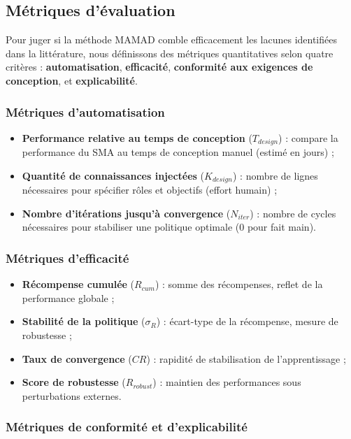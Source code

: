 \subsection{Métriques d'évaluation}

Pour juger si la méthode \ac{MAMAD} comble efficacement les lacunes identifiées dans la littérature, nous définissons des métriques quantitatives selon quatre critères : \textbf{automatisation}, \textbf{efficacité}, \textbf{conformité aux exigences de conception}, et \textbf{explicabilité}.

\subsubsection{Métriques d'automatisation}

\begin{itemize}
    \item \textbf{Performance relative au temps de conception} ($T_{design}$) : compare la performance du \ac{SMA} au temps de conception manuel (estimé en jours) ;
    \item \textbf{Quantité de connaissances injectées} ($K_{design}$) : nombre de lignes nécessaires pour spécifier rôles et objectifs (effort humain) ;
    \item \textbf{Nombre d'itérations jusqu'à convergence} ($N_{iter}$) : nombre de cycles nécessaires pour stabiliser une politique optimale (0 pour  fait main).
\end{itemize}

\subsubsection{Métriques d'efficacité}

\begin{itemize}
    \item \textbf{Récompense cumulée} ($R_{cum}$) : somme des récompenses, reflet de la performance globale ;
    \item \textbf{Stabilité de la politique} ($\sigma_R$) : écart-type de la récompense, mesure de robustesse ;
    \item \textbf{Taux de convergence} ($CR$) : rapidité de stabilisation de l'apprentissage ;
    \item \textbf{Score de robustesse} ($R_{robust}$) : maintien des performances sous perturbations externes.
\end{itemize}

\subsubsection{Métriques de conformité et d'explicabilité}

